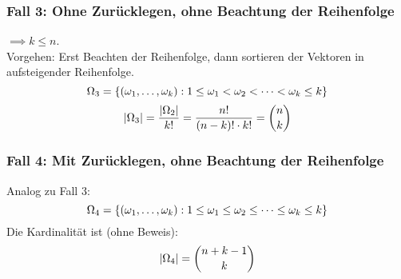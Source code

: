 \subsubsection{Fall 3: Ohne Zurücklegen, ohne Beachtung der Reihenfolge}
$\implies k \leq n$.\\
Vorgehen: Erst Beachten der Reihenfolge, dann sortieren der Vektoren in aufsteigender Reihenfolge.
\begin{equation*}
    \Omega_3 = \{ (\omega_1, \dots ,\omega_k): 1 \leq \omega_1 < \omega_2 < \dots < \omega_k \leq k \}
\end{equation*}
\begin{equation*}
    |\Omega_3| = \frac{|\Omega_2|}{k!} = \frac{n!}{(n-k)! \cdot k!} = \binom{n}{k}
\end{equation*}

\subsubsection{Fall 4: Mit Zurücklegen, ohne Beachtung der Reihenfolge}
Analog zu Fall 3:
\begin{equation*}
    \Omega_4 = \{ (\omega_1, \dots ,\omega_k): 1 \leq \omega_1 \leq \omega_2 \leq \dots \leq \omega_k \leq k \}
\end{equation*}
Die Kardinalität ist (ohne Beweis):
\begin{equation*}
    |\Omega_4| = \binom{n+k-1}{k}
\end{equation*}